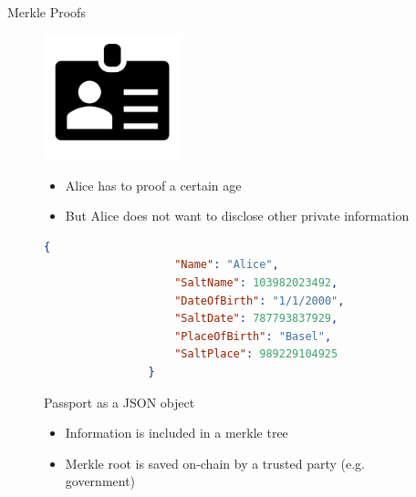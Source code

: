 \documentclass[handout]{beamer}
\begin{document}

\begin{frame}[fragile]{Merkle Proofs}
	\begin{figure}
		\begin{minipage}[h]{0.55\linewidth}
			\centering
			\includegraphics[width=4cm]{../assets/images/id.PNG}
		\end{minipage}%
		\hfill
		\begin{minipage}[h]{0.45\linewidth}
			\begin{itemize}
				\item<1 ->Alice has to proof a certain age
				\item<1 ->But Alice does not want to disclose other private information
			\end{itemize}
		\end{minipage}
	\end{figure}
	\vspace{-0.5cm}
	\begin{figure}
		\begin{minipage}[h]{0.55\linewidth}
			\begin{lstlisting}[language=json,firstnumber=1]
				{
					"Name": "Alice",
					"SaltName": 103982023492,
					"DateOfBirth": "1/1/2000",
					"SaltDate": 787793837929,
					"PlaceOfBirth": "Basel",
					"SaltPlace": 989229104925
				}
			\end{lstlisting}
			\centering
			\scriptsize{Passport as a JSON object}
		\end{minipage}%
		\hfill
		\begin{minipage}[h]{0.45\linewidth}
			\begin{itemize}
				\item<2 ->Information is included in a merkle tree
				\item<2 ->Merkle root is saved on-chain by a trusted party (e.g. government)
			\end{itemize}
		\end{minipage}
	\end{figure}
\end{frame}

\end{document}
